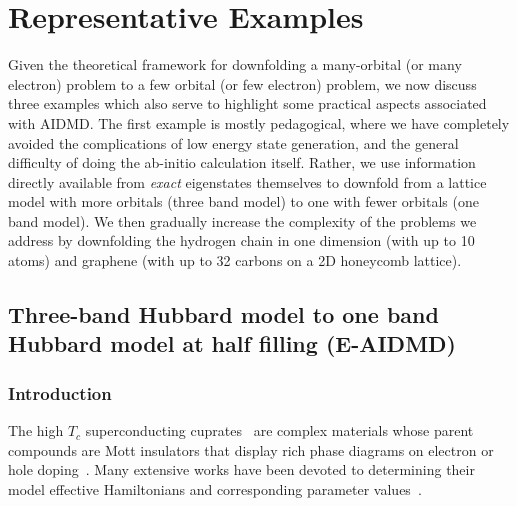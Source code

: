 \section{Representative Examples}
Given the theoretical framework for downfolding a many-orbital (or many electron) problem to a 
few orbital (or few electron) problem, we now discuss three examples which also serve to highlight some practical aspects 
associated with AIDMD. The first example is mostly pedagogical, 
where we have completely avoided the complications of low energy state generation, 
and the general difficulty of doing the ab-initio calculation itself. Rather, we use information directly available 
from \emph{exact} eigenstates themselves to downfold from a lattice model with more orbitals (three band model) 
to one with fewer orbitals (one band model). We then gradually increase the complexity of the problems we address
by downfolding the hydrogen chain in one dimension (with up to 10 atoms) and graphene 
(with up to 32 carbons on a 2D honeycomb lattice).
  
\subsection{Three-band Hubbard model to one band Hubbard model at half filling (E-AIDMD)}
\subsubsection{Introduction}
The high $T_c$ superconducting cuprates~\cite{Bednorz1986} are complex materials whose parent compounds 
are Mott insulators that display rich phase diagrams on electron or hole doping~\cite{Dagotto_RevModPhys, LeeWen_RevModPhys}. 
Many extensive works have been devoted to determining their model effective Hamiltonians and corresponding parameter 
values~\cite{Emery, ZhangRice, tJSpalek, Hybertssn_PRB1989, Hybertsen_PRB1990, Pavirini, Kent_Hubbard}. 

